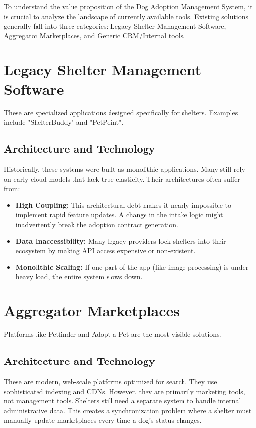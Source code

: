 To understand the value proposition of the Dog Adoption Management System, it is crucial to analyze the landscape of currently available tools. Existing solutions generally fall into three categories: Legacy Shelter Management Software, Aggregator Marketplaces, and Generic CRM/Internal tools.

\section{Legacy Shelter Management Software}

These are specialized applications designed specifically for shelters. Examples include "ShelterBuddy" and "PetPoint".

\subsection{Architecture and Technology}
Historically, these systems were built as monolithic applications. Many still rely on early cloud models that lack true elasticity. Their architectures often suffer from:
\begin{itemize}
    \item \textbf{High Coupling:} This architectural debt makes it nearly impossible to implement rapid feature updates. A change in the intake logic might inadvertently break the adoption contract generation.
    \item \textbf{Data Inaccessibility:} Many legacy providers lock shelters into their ecosystem by making API access expensive or non-existent.
    \item \textbf{Monolithic Scaling:} If one part of the app (like image processing) is under heavy load, the entire system slows down.
\end{itemize}

\section{Aggregator Marketplaces}

Platforms like Petfinder and Adopt-a-Pet are the most visible solutions.

\subsection{Architecture and Technology}
These are modern, web-scale platforms optimized for search. They use sophisticated indexing and CDNs. However, they are primarily marketing tools, not management tools. Shelters still need a separate system to handle internal administrative data. This creates a synchronization problem where a shelter must manually update marketplaces every time a dog's status changes.

